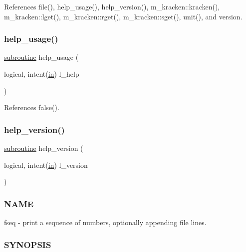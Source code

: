 References file(), help\+\_\+usage(), help\+\_\+version(), m\+\_\+kracken\+::kracken(), m\+\_\+kracken\+::lget(), m\+\_\+kracken\+::rget(), m\+\_\+kracken\+::sget(), unit(), and version.

\mbox{\label{fseq_8f90_a3e09a3b52ee8fb04eeb93fe5761626a8}} 
\subsubsection{\texorpdfstring{help\+\_\+usage()}{help\_usage()}}
{\footnotesize\ttfamily \hyperlink{M__stopwatch_83_8txt_acfbcff50169d691ff02d4a123ed70482}{subroutine} help\+\_\+usage (\begin{DoxyParamCaption}\item[{logical, intent(\hyperlink{M__journal_83_8txt_afce72651d1eed785a2132bee863b2f38}{in})}]{l\+\_\+help }\end{DoxyParamCaption})}



References false().

\mbox{\label{fseq_8f90_a39c21619b08a3c22f19e2306efd7f766}} 
\subsubsection{\texorpdfstring{help\+\_\+version()}{help\_version()}}
{\footnotesize\ttfamily \hyperlink{M__stopwatch_83_8txt_acfbcff50169d691ff02d4a123ed70482}{subroutine} help\+\_\+version (\begin{DoxyParamCaption}\item[{logical, intent(\hyperlink{M__journal_83_8txt_afce72651d1eed785a2132bee863b2f38}{in})}]{l\+\_\+version }\end{DoxyParamCaption})}



\subsubsection*{N\+A\+ME}

fseq -\/ print a sequence of numbers, optionally appending file lines. \subsubsection*{S\+Y\+N\+O\+P\+S\+IS}

